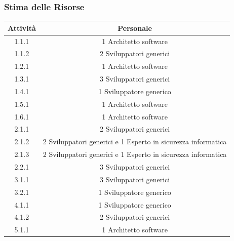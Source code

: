 \subsubsection{Stima delle Risorse}
\begin{table}[H]
    \centering
    \begin{tabular}{|c|c|}
        \hline
        \textbf{Attività} & \textbf{Personale}                                           \\
        \hline
        1.1.1             & 1 Architetto software                                        \\
        1.1.2             & 2 Sviluppatori generici                                      \\
        1.2.1             & 1 Architetto software                                        \\
        1.3.1             & 3 Sviluppatori generici                                      \\
        1.4.1             & 1 Sviluppatore generico                                      \\
        1.5.1             & 1 Architetto software                                        \\
        1.6.1             & 1 Architetto software                                        \\
        2.1.1             & 2 Sviluppatori generici                                      \\
        2.1.2             & 2 Sviluppatori generici e 1 Esperto in sicurezza informatica \\
        2.1.3             & 2 Sviluppatori generici e 1 Esperto in sicurezza informatica \\
        2.2.1             & 3 Sviluppatori generici                                      \\
        3.1.1             & 3 Sviluppatori generici                                      \\
        3.2.1             & 1 Sviluppatore generico                                      \\
        4.1.1             & 1 Sviluppatore generico                                      \\
        4.1.2             & 2 Sviluppatori generici                                      \\
        5.1.1             & 1 Architetto software                                        \\

\end{tabular}
\end{table}
